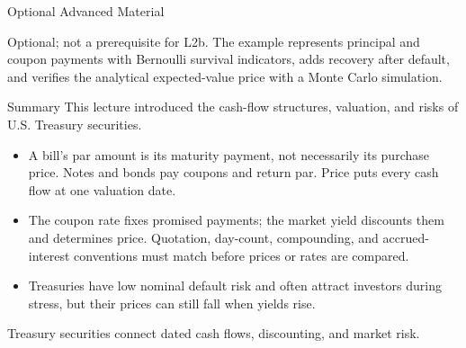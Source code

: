 \documentclass[aspectratio=169,11pt]{beamer}
\begin{document}
\begin{frame}{Optional Advanced Material}
  \vspace{0.2em}
  {\normalsize\textbf{} \par
  }

  \vspace{0.5em}
  Optional; not a prerequisite for L2b. The example represents principal and
  coupon payments with Bernoulli survival indicators, adds recovery after
  default, and verifies the analytical expected-value price with a Monte Carlo
  simulation.
\end{frame}

\begin{frame}{Summary}
  This lecture introduced the cash-flow structures, valuation, and risks of U.S.
  Treasury securities.

  \vspace{0.45em}
  {\large\textbf{}}
  \vspace{0.2em}
  \begin{itemize}\setlength{\itemsep}{0.35em}
    \item \textbf{} A bill's par amount is its
      maturity payment, not necessarily its purchase price. Notes and bonds pay
      coupons and return par. Price puts every cash flow at one valuation date.
    \item \textbf{} The coupon
      rate fixes promised payments; the market yield discounts them and determines
      price. Quotation, day-count, compounding, and accrued-interest conventions
      must match before prices or rates are compared.
    \item \textbf{} Treasuries have low
      nominal default risk and often attract investors during stress, but their
      prices can still fall when yields rise.
  \end{itemize}

  \vspace{0.5em}
  Treasury securities connect dated cash flows, discounting, and market risk.
\end{frame}

\end{document}
